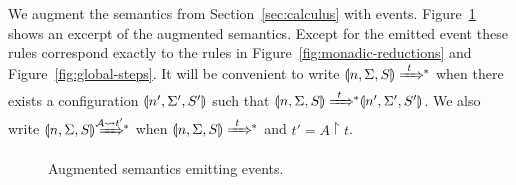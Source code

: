 We augment the semantics from Section~\ref{sec:calculus} with events. Figure~\ref{fig:event-semantics} shows an excerpt of the augmented semantics. Except for the emitted event these rules correspond exactly to the rules in Figure~\ref{fig:monadic-reductions} and Figure~\ref{fig:global-steps}. It will be convenient to write $\gconfig{n}{\env}{S} \gstepstos[][t]$ when there exists a configuration $\llparenthesis n', \Sigma', S' \rrparenthesis$ such that $\gconfig{n}{\env}{S} \gstepstos[][t] \gconfig{n'}{\env'}{S'}$. We also write $\gconfig{n}{\env}{S} \gstepstos[][\Attacker \filtertrace t']$ when $\gconfig{n}{\env}{S} \gstepstos[][t]$ and $t' = A \upharpoonright t$.

\begin{figure}
\centering
{}
\caption{Augmented semantics emitting events.}
\label{fig:event-semantics}
\end{figure}

